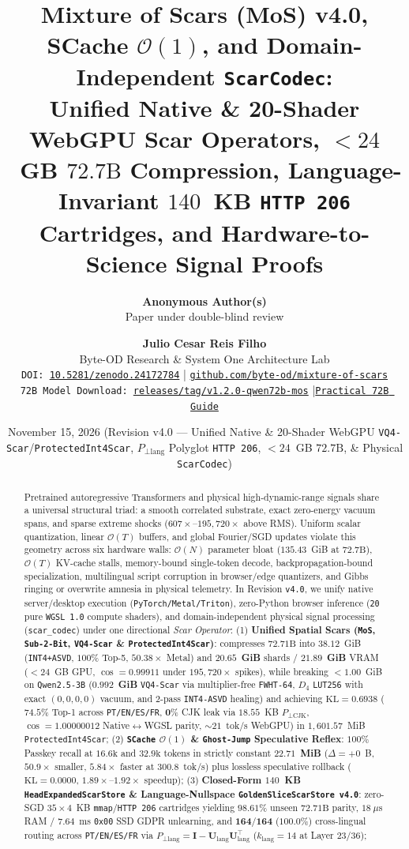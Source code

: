 \documentclass[10pt,twocolumn]{article}
\title{\textbf{Mixture of Scars (MoS) v4.0, SCache $\mathcal{O}(1)$, and Domain-Independent \texttt{ScarCodec}:\\Unified Native \& 20-Shader WebGPU Scar Operators, $<24$~GB $72.7\text{B}$ Compression, Language-Invariant $140$~KB \texttt{HTTP 206} Cartridges, and Hardware-to-Science Signal Proofs}}
\author{
  \textbf{Anonymous Author(s)}\\
  Paper under double-blind review
}
\author{
  \textbf{Julio Cesar Reis Filho}\\
  Byte-OD Research \& System One Architecture Lab\\
  \texttt{DOI: \href{https://doi.org/10.5281/zenodo.24172784}{10.5281/zenodo.24172784}} \quad|\quad
  \texttt{\href{https://github.com/byte-od/mixture-of-scars}{github.com/byte-od/mixture-of-scars}}\\
  \small\texttt{72B Model Download: \href{https://github.com/byte-od/mixture-of-scars/releases/tag/v1.2.0-qwen72b-mos}{releases/tag/v1.2.0-qwen72b-mos}} \quad|\quad \texttt{\href{https://github.com/byte-od/mixture-of-scars/blob/main/docs/GUIA_PRATICO_MOS_SCACHE_72B.md}{Practical 72B Guide}}
}
\date{November 15, 2026 \quad (Revision v4.0 --- Unified Native \& 20-Shader WebGPU \texttt{VQ4-Scar}/\texttt{ProtectedInt4Scar}, $P_{\perp\text{lang}}$ Polyglot \texttt{HTTP 206}, $<24$~GB $72.7\text{B}$, \& Physical \texttt{ScarCodec})}
\begin{document}
\maketitle

\begin{abstract}
Pretrained autoregressive Transformers and physical high-dynamic-range signals share a universal structural triad: a smooth correlated substrate, exact zero-energy vacuum spans, and sparse extreme shocks ($607\times$--$195{,}720\times$ above RMS). Uniform scalar quantization, linear $\mathcal{O}(T)$ buffers, and global Fourier/SGD updates violate this geometry across six hardware walls: $\mathcal{O}(N)$ parameter bloat ($135.43$~GiB at $72.7\text{B}$), $\mathcal{O}(T)$ KV-cache stalls, memory-bound single-token decode, backpropagation-bound specialization, multilingual script corruption in browser/edge quantizers, and Gibbs ringing or overwrite amnesia in physical telemetry. In Revision \texttt{v4.0}, we unify native server/desktop execution (\texttt{PyTorch/Metal/Triton}), zero-Python browser inference (\texttt{20} pure \texttt{WGSL 1.0} compute shaders), and domain-independent physical signal processing (\texttt{scar\_codec}) under one directional \emph{Scar Operator}:
(1) \textbf{Unified Spatial Scars (\texttt{MoS}, \texttt{Sub-2-Bit}, \texttt{VQ4-Scar} \& \texttt{ProtectedInt4Scar})}: compresses $72.71\text{B}$ into $38.12$~GiB (\texttt{INT4+ASVD}, $100\%$ Top-5, $50.38\times$ Metal) and $\mathbf{20.65}$~\textbf{GiB} shards / $\mathbf{21.89}$~\textbf{GiB} VRAM ($<24$~GB GPU, $\cos=0.99911$ under $195{,}720\times$ spikes), while breaking $<1.00$~GiB on \texttt{Qwen2.5-3B} ($\mathbf{0.992}$~\textbf{GiB} \texttt{VQ4-Scar} via multiplier-free \texttt{FWHT-64}, $D_4$ \texttt{LUT256} with exact $(0,0,0,0)$ vacuum, and $2$-pass \texttt{INT4-ASVD} healing) and achieving $\mathrm{KL}=\mathbf{0.6938}$ ($74.5\%$ Top-1 across \texttt{PT/EN/ES/FR}, $\mathbf{0\%}$ CJK leak via $18.55$~KB $P_{\perp\text{CJK}}$, $\cos=\mathbf{1.00000012}$ Native$\leftrightarrow$WGSL parity, $\sim 21$~tok/s WebGPU) in $1{,}601.57$~MiB \texttt{ProtectedInt4Scar};
(2) \textbf{\texttt{SCache} $\mathcal{O}(1)$ \& \texttt{Ghost-Jump} Speculative Reflex}: $100\%$ Passkey recall at $16.6\text{k}$ and $32.9\text{k}$ tokens in strictly constant $\mathbf{22.71}$~\textbf{MiB} ($\Delta=+0$~B, $50.9\times$ smaller, $5.84\times$ faster at $300.8$~tok/s) plus lossless speculative rollback ($\mathrm{KL}=0.0000$, $1.89\times$--$1.92\times$ speedup);
(3) \textbf{Closed-Form $140$~KB \texttt{HeadExpandedScarStore} \& Language-Nullspace \texttt{GoldenSliceScarStore v4.0}}: zero-SGD $35 \times 4$~KB \texttt{mmap}/\texttt{HTTP 206} cartridges yielding $98.61\%$ unseen $72.71\text{B}$ parity, $18~\mu$s RAM / $7.64$~ms \texttt{0x00} SSD GDPR unlearning, and $\mathbf{164/164}$ ($\mathbf{100.0\%}$) cross-lingual routing across \texttt{PT/EN/ES/FR} via $P_{\perp\text{lang}} = \mathbf{I} - \mathbf{U}_{\text{lang}}\mathbf{U}_{\text{lang}}^\top$ ($k_{\text{lang}}=14$ at Layer $23/36$);

\end{abstract}
\end{document}
